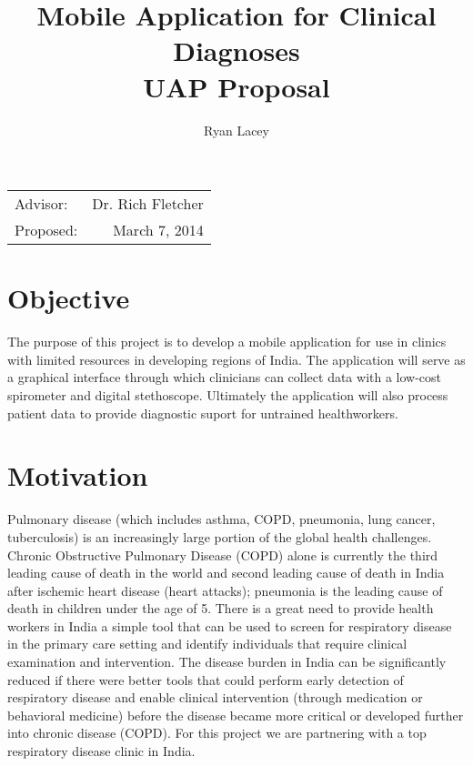 \documentclass{article}
\title{Mobile Application for Clinical Diagnoses  \\ UAP Proposal} %
\author{Ryan Lacey}
\date{}
\begin{document}
\maketitle %

\begin{center}
\begin{tabular}{l r}
Advisor: & Dr. Rich Fletcher \\
Proposed: & March 7, 2014 \\
\end{tabular}
\end{center}

\section{Objective}

The purpose of this project is to develop a mobile application for use in clinics with limited resources in developing regions of India. The application will serve as a graphical interface through which clinicians can collect data with a low-cost spirometer and digital stethoscope. Ultimately the application will also process patient data to provide diagnostic suport for untrained healthworkers. \\



\section{Motivation}

Pulmonary disease (which includes asthma, COPD, pneumonia, lung cancer, tuberculosis) is an increasingly large portion of the global health challenges. Chronic Obstructive Pulmonary Disease (COPD) alone is currently the third leading cause of death in the world and second leading cause of death in India after ischemic heart disease (heart attacks); pneumonia is the leading cause of death in children under the age of 5. There is a great need to provide health workers in India a simple tool that can be used to screen for respiratory disease in the primary care setting and identify individuals that require clinical examination and intervention. The disease burden in India can be significantly reduced if there were better tools that could perform early detection of respiratory disease and enable clinical intervention (through medication or behavioral medicine) before the disease became more critical or developed further into chronic disease (COPD). For this project we are partnering with a top respiratory disease clinic in India.
\end{document}
